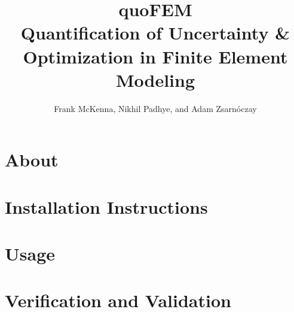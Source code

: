 \documentclass{simcenterdocumentation}
\begin{document}
\title{quoFEM\\ \Large Quantification of Uncertainty \& Optimization in Finite Element Modeling}
\author{Frank McKenna, Nikhil Padhye, and Adam Zsarn\'oczay}


\hypersetup{pageanchor=false}
\maketitle
\copyrightpage
\acknowledgments

\hypersetup{pageanchor=true}
\begin{frontmatter}

\pagestyle{plain}
{
  \renewcommand{\thispagestyle}[1]{}
  \tableofcontents
  \clearpage
  \listoffigures
  \clearpage
  \listoftables
}

\end{frontmatter}
\pagestyle{somewhatsimple}

\chapter{About}
\label{chap:about}


\chapter{Installation Instructions}
\label{chap:installation}


\chapter{Usage}
\label{chap:usage}


\chapter{Verification and Validation}
\label{chap:vnv}

\end{document}
